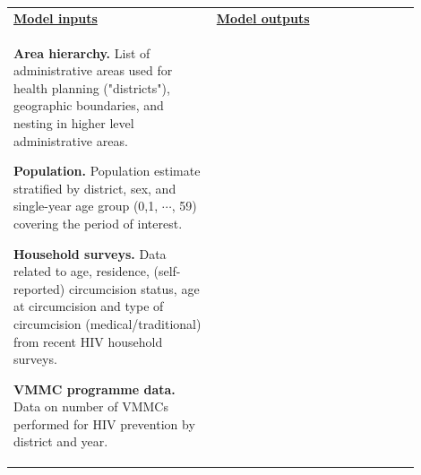 \documentclass{article}
\begin{document}
\begin{appendix}
{\begin{table}[H]
\begin{tabular}{| p{0.45\linewidth} | p{0.45\linewidth} |}
			\textbf{\underline{Model inputs}} & \textbf{\underline{Model outputs}} \\
			
			{\bf Area hierarchy.} List of administrative areas used for health planning ("districts"), geographic boundaries, and nesting in higher level administrative areas.
			\vspace{5pt}
			
			{\bf Population.} Population estimate stratified by district, sex, and single-year age group (0,1, $\cdots$, 59) covering the period of interest. 
			\vspace{5pt}
			
			{\bf Household surveys.} Data related to age, residence, (self-reported) circumcision status, age at circumcision and type of circumcision (medical/traditional) from recent HIV household surveys. 
			\vspace{5pt}
			
			{\bf VMMC programme data.} Data on number of VMMCs performed for HIV prevention by district and year.
			

\end{tabular}
\end{table}}
\end{appendix}
\end{document}
